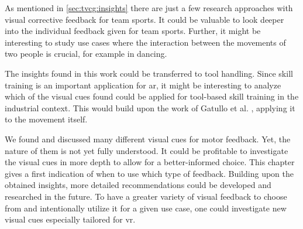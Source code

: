 As mentioned in \autoref{sec:tvcg:insights} there are just a few research approaches with visual corrective feedback for team sports. It could be valuable to look deeper into the individual feedback given for team sports. Further, it might be interesting to study use cases where the interaction between the movements of two people is crucial, for example in dancing.

The insights found in this work could be transferred to tool handling. Since skill training is an important application for \acrshort{ar}, it might be interesting to analyze which of the visual cues found could be applied for tool-based skill training in the industrial context. This would build upon the work of Gatullo et al. \cite{gatullo2020whw}, applying it to the movement itself.

We found and discussed many different visual cues for motor feedback. Yet, the nature of them is not yet fully understood. It could be profitable to investigate the visual cues in more depth to allow for a better-informed choice. This chapter gives a first indication of when to use which type of feedback. Building upon the obtained insights, more detailed recommendations could be developed and researched in the future. To have a greater variety of visual feedback to choose from and intentionally utilize it for a given use case, one could investigate new visual cues especially tailored for \acrshort{vr}.


